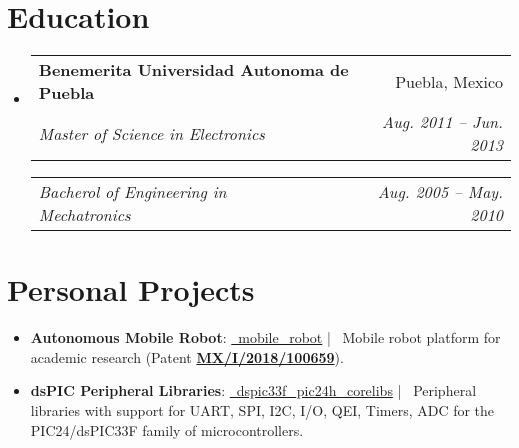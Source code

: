 \documentclass[letterpaper,11pt]{article}
\makeatletter
\newcommand{\resumeItem}[2]{
  \item\small{
    \textbf{#1}{: #2 \vspace{-2pt}}
  }
}
\newcommand{\resumeSubheading}[4]{
  \vspace{-1pt}\item
    \begin{tabular*}{0.97\textwidth}[t]{l@{\extracolsep{\fill}}r}
      \textbf{#1} & #2 \\
      \textit{\small#3} & \textit{\small #4} \\
    \end{tabular*}\vspace{-5pt}
}
\newcommand{\resumeSubSubheading}[2]{
    \begin{tabular*}{0.97\textwidth}{l@{\extracolsep{\fill}}r}
      \textit{\small#1} & \textit{\small #2} \\
    \end{tabular*}\vspace{-5pt}
}
\newcommand{\resumeSubItem}[2]{\resumeItem{#1}{#2}\vspace{-1pt}}
\newcommand{\resumeSubHeadingListStart}{\begin{itemize}[leftmargin=*]}
\newcommand{\resumeSubHeadingListEnd}{\end{itemize}\vspace{5pt}}
\def \Patent{https://drive.google.com/file/d/1DsnaAByaBixFv9GfyCH6JUAA95fj8aTY/view}
\makeatother
\begin{document}
\section{Education}
  \resumeSubHeadingListStart
    \resumeSubheading
      {Benemerita Universidad Autonoma de Puebla}{Puebla, Mexico}
      {Master of Science in Electronics}{Aug. 2011 -- Jun. 2013}
   \resumeSubSubheading
      {Bacherol of Engineering in Mechatronics}{Aug. 2005 -- May. 2010}
  \resumeSubHeadingListEnd


\section{Personal Projects}
  \resumeSubHeadingListStart
    \resumeSubItem{Autonomous Mobile Robot}
      {\href{https://github.com/datgeezus/mobile_robot}{\faGithub \, mobile\_robot}
      | \, Mobile robot platform for academic research (Patent \textbf{\href{\Patent}{MX/I/2018/100659}}). }
    \resumeSubItem{dsPIC Peripheral Libraries}
      {\href{https://github.com/datgeezus/dspic33f_pic24h_corelibs}{\faGithub \, dspic33f\_pic24h\_corelibs} 
      | \,  Peripheral libraries with support for UART, SPI, I2C, I/O, QEI, Timers, ADC for the PIC24/dsPIC33F 
      family of microcontrollers.}
  \resumeSubHeadingListEnd


 
\end{document}

